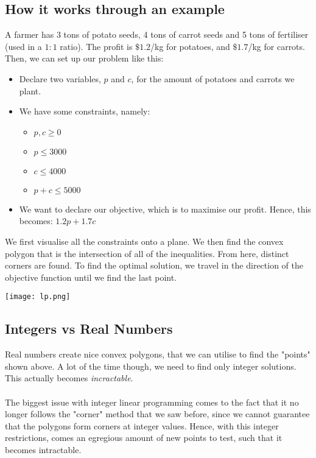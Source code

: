 \documentclass[journal, letterpaper]{IEEEtran}
\begin{document}
  \subsection{How it works through an example}
  A farmer has 3 tons of potato seeds, 4 tons of carrot seeds and 5 tons of fertiliser (used in a $1:1$ ratio). The profit
  is $\$1.2$/kg for potatoes, and $\$1.7$/kg for carrots. Then, we can set up our problem like this: \\ 
  \begin{itemize}
    \item Declare two variables, $p$ and $c$, for the amount of potatoes and carrots we plant.
    \item We have some constraints, namely:
      \begin{itemize}
        \item $p, c \ge 0$
        \item $p \le 3000$
        \item $c \le 4000$
        \item $p + c \le 5000$
      \end{itemize}
    \item We want to declare our objective, which is to maximise our profit. Hence, this becomes: $1.2p + 1.7c$
  \end{itemize}
  We first visualise all the constraints onto a plane. We then find the convex polygon that is the intersection of all of the
  inequalities. From here, distinct corners are found. To find the optimal solution, we travel in the direction of the objective
  function until we find the last point.
  \begin{center}
  \texttt{[image: lp.png]}
  \end{center}
  \subsection{Integers vs Real Numbers}
  Real numbers create nice convex polygons, that we can utilise to find the "points" shown above. A lot of the time though,
  we need to find only integer solutions. This actually becomes \emph{incractable}. \\ \\The biggest issue with integer linear
  programming comes to the fact that it no longer follows the "corner" method that we saw before, since we cannot
  guarantee that the polygons form corners at integer values. Hence, with this integer restrictions, comes an egregious amount
  of new points to test, such that it becomes intractable.
\end{document}
